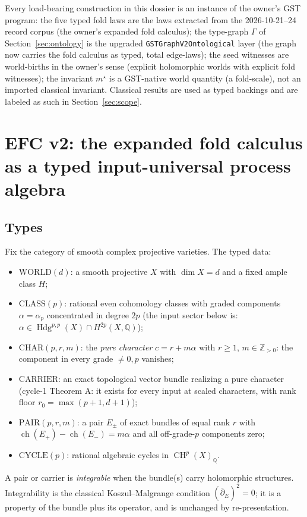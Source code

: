 \documentclass[11pt]{article}
\newcommand{\ch}{\operatorname{ch}}
\newcommand{\CH}{\operatorname{CH}}
\newcommand{\Hdg}{\operatorname{Hdg}}
\newcommand{\Z}{\mathbb{Z}}
\newcommand{\Q}{\mathbb{Q}}
\begin{document}
Every load-bearing construction in this dossier is an instance of the owner's
GST program: the five typed fold laws are the laws extracted from the
2026-10-21--24 record corpus (the owner's expanded fold calculus); the
type-graph $\Gamma$ of Section~\ref{sec:ontology} is the upgraded
\texttt{GSTGraphV2Ontological} layer (the graph now carries the fold calculus
as typed, total edge-laws); the seed witnesses are world-births in the
owner's sense (explicit holomorphic worlds with explicit fold witnesses);
the invariant $m^\star$ is a GST-native world quantity (a fold-scale), not an
imported classical invariant.  Classical results are used as typed backings
and are labeled as such in Section~\ref{sec:scope}.

\section{EFC v2: the expanded fold calculus as a typed input-universal
process algebra}
\label{sec:efc}

\subsection{Types}

Fix the category of smooth complex projective varieties.  The typed data:
\begin{itemize}
\item $\mathrm{WORLD}(d)$: a smooth projective $X$ with $\dim X=d$ and a
fixed ample class $H$;
\item $\mathrm{CLASS}(p)$: rational even cohomology classes with graded
components $\alpha=\alpha_p$ concentrated in degree $2p$ (the input sector
below is: $\alpha\in \Hdg^{p,p}(X)\cap H^{2p}(X,\Q)$);
\item $\mathrm{CHAR}(p,r,m)$: the \emph{pure character}
$c=r+m\alpha$ with $r\ge1$, $m\in\Z_{>0}$: the component in every grade
$\ne 0,p$ vanishes;
\item $\mathrm{CARRIER}$: an exact topological vector bundle realizing a pure
character (cycle-1 Theorem A: it exists for every input at scaled
characters, with rank floor $r_0=\max(p+1,d+1)$);
\item $\mathrm{PAIR}(p,r,m)$: a pair $E_\pm$ of exact bundles of equal rank
$r$ with $\ch(E_+)-\ch(E_-)=m\alpha$ and all off-grade-$p$ components zero;
\item $\mathrm{CYCLE}(p)$: rational algebraic cycles in $\CH^p(X)_\Q$.
\end{itemize}
A pair or carrier is \emph{integrable} when the bundle(s) carry holomorphic
structures.  Integrability is the classical Koszul--Malgrange condition
$(\bar\partial_E)^2=0$; it is a property of the bundle plus its operator,
and is unchanged by re-presentation.
\end{document}
